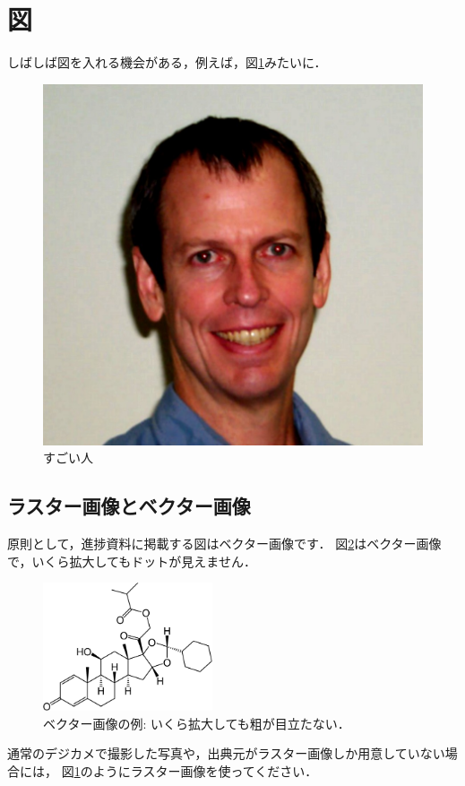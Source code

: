 \documentclass[lualatex,a4paper,ja = standard, twoside, twocolumn]{bxjsarticle}
\begin{document}
\section{図}
  しばしば図を入れる機会がある，例えば，図\ref{pht_doyle}みたいに．
    \begin{figure}[tbp]
      \centering
      \includegraphics[width = 0.95\columnwidth]{figure/doyle_photo.jpg}
      \caption{すごい人} \label{pht_doyle}
    \end{figure}
  \subsection{ラスター画像とベクター画像}
    原則として，進捗資料に掲載する図はベクター画像です．
    図\ref{fig_ciclesonide}はベクター画像で，いくら拡大してもドットが見えません．
      \begin{figure}[tbp]
        \centering
        \includegraphics[width = 5cm]{figure/chemi_vec.pdf}
        \caption{ベクター画像の例: いくら拡大しても粗が目立たない．} \label{fig_ciclesonide}
      \end{figure}
    通常のデジカメで撮影した写真や，出典元がラスター画像しか用意していない場合には，
    図\ref{pht_doyle}のようにラスター画像を使ってください．
\end{document}
